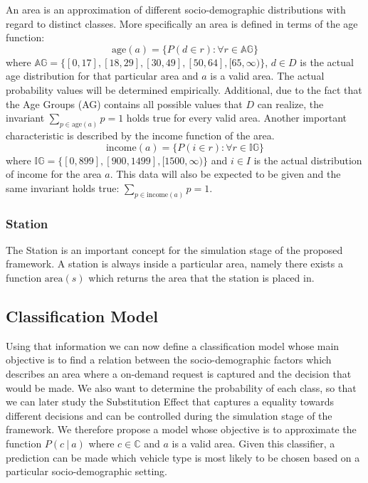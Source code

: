 An area is an approximation of different socio-demographic distributions with regard to 
distinct classes. More specifically an area is defined in terms of the age function:
$$
\text{age}(a) = \{ P(d \in r): \forall r \in \mathbb{AG} \}
$$
where $\mathbb{AG} = \{ [0,17], [18,29], [30,49], [50,64], [65,\infty) \}$, $d \in D$ is the
actual age distribution for that particular area and $a$ is a valid area. The actual probability 
values will be determined empirically. Additional, due to the fact that the
Age Groups (AG) contains all possible values that $D$ can realize, the invariant 
$\sum_{p \in \text{age}(a)} p = 1$ holds true for every valid area. Another important 
characteristic is described by the income function of the area.
$$
\text{income}(a) = \{ P(i \in r): \forall r \in \mathbb{IG} \}
$$
where $\mathbb{IG} = \{ [0,899], [900, 1499], [1500, \infty) \}$ and $i \in I$ is the actual distribution
of income for the area $a$. This data will also be expected to be given and the same invariant holds true:
$\sum_{p \in \text{income}(a)} p = 1$.

\subsubsection{Station}
\label{sub_sec:Method/Concepts/Station}

The Station is an important concept for the simulation stage of the proposed framework. A station is always
inside a particular area, namely there exists a function $\text{area}(s)$ which returns the area that the 
station is placed in.

\subsection{Classification Model}
\label{sub_sec:Method/Class}

Using that information we can now define a classification model whose
main objective is to find a relation between the socio-demographic factors which describes an area
where a on-demand request is captured and the decision that would be made. We also want to determine the
probability of each class, so that we can later study the Substitution Effect %
that captures a equality towards different decisions and can be controlled during the
simulation stage of the framework. We therefore propose a model whose objective is to
approximate the function $P(c \ | \ a)$ where $c \in \mathbb{C}$ and $a$ is a valid area.
Given this classifier, a prediction can be made which vehicle type is most likely to be chosen based
on a particular socio-demographic setting.

